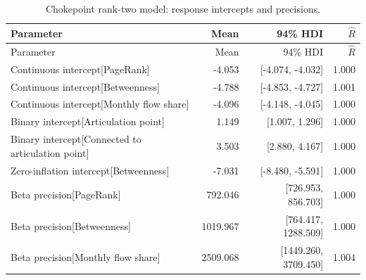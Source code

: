 \documentclass[pdftex,12pt,openright,a4paper,oneside]{book}
\begin{document}
\begin{longtable}{@{}p{}rrr@{}}

\caption{Chokepoint rank-two model: response intercepts and precisions.}\label{tab:chokepoint_rank2_430}\\

\toprule

Parameter & Mean & 94\% HDI & $\widehat R$ \\

\midrule\endfirsthead

\toprule

Parameter & Mean & 94\% HDI & $\widehat R$ \\

\midrule\endhead

Continuous intercept[PageRank] & -4.053 & [-4.074, -4.032] & 1.000 \\

Continuous intercept[Betweenness] & -4.788 & [-4.853, -4.727] & 1.001 \\

Continuous intercept[Monthly flow share] & -4.096 & [-4.148, -4.045] & 1.000 \\

Binary intercept[Articulation point] & 1.149 & [1.007, 1.296] & 1.000 \\

Binary intercept[Connected to articulation point] & 3.503 & [2.880, 4.167] & 1.000 \\

Zero-inflation intercept[Betweenness] & -7.031 & [-8.480, -5.591] & 1.000 \\

Beta precision[PageRank] & 792.046 & [726.953, 856.703] & 1.000 \\

Beta precision[Betweenness] & 1019.967 & [764.417, 1288.509] & 1.000 \\

Beta precision[Monthly flow share] & 2509.068 & [1449.260, 3709.450] & 1.004 \\

\bottomrule\end{longtable}
\end{document}
